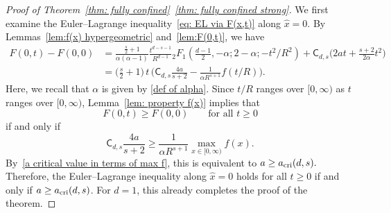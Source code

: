 \documentclass{amsart}
\theoremstyle{plain}
\theoremstyle{remark}
\numberwithin{equation}{section}
\begin{document}
\begin{proof}[Proof of Theorem~\ref{thm: fully confined}~\ref{thm: fully confined strong}] 
We first examine the Euler--Lagrange inequality~\eqref{eq: EL via F(x,t)}
along $\hat{x}=0$. By Lemmas~\ref{lem:f(x) hypergeometric}
and~\ref{lem:F(0,t)}, we have  
    \begin{equation}
    \begin{split}
        F(0,t)-F(0,0) &=\frac{\frac{s}{2}+1}{\alpha(\alpha-1)} \frac{t^{d-s-1}}{R^{d-1}} {}_2F_1 (\tfrac{d-1}{2},-\alpha; 2-\alpha ;-t^2/R^2)
        + \mathsf{C}_{d,s} \Big(2at + \frac{s+2}{2\alpha}t^2\Big)
        \\
        &=  \Big(\frac{s}{2}+1 \Big) \, t \, \Big( \mathsf{C}_{d,s} \frac{4a}{s+2} - \frac{1}{\alpha R^{s+1}}f(t/R) \Big). 
    \end{split}
    \end{equation} 
    Here, we recall that $\alpha$ is given by \eqref{def of alpha}.  
    Since $t/R$ ranges over $[0,\infty)$ as $t$ ranges over
$[0,\infty)$, Lemma~\ref{lem: property f(x)} implies that 
\begin{equation} \label{F(0,t) vs F(0,0)}
    F(0,t)\ge F(0,0)
    \qquad\text{for all }t\ge0
\end{equation} 
if and only if
\[
  \mathsf{C}_{d,s} \frac{4a}{s+2} 
    \ge
    \frac{1}{\alpha R^{s+1}}
    \max_{x\in[0,\infty)}f(x).
\]
By~\eqref{a critical value in terms of max f}, this is equivalent to $   a\ge a_{\rm cri}(d,s).$  
Therefore, the Euler--Lagrange inequality along $\hat{x}=0$ holds for all $t\ge0$ if and only if $a\ge a_{\rm cri}(d,s)$. For $d=1$, this already completes the proof of the theorem. 




\end{proof}
\end{document}
